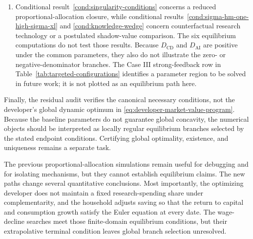 \begin{enumerate}[label=(\roman*)]
    and $qA/K$ are terminal boundary conditions. Only the convergence of the
    non-imposed ratios and the stability of the initial jumps and estimated boundary
    date constitute independent numerical evidence for the conditional singular
    branch.
    \item Conditional result~\ref{cond:singularity-conditions} concerns a reduced
    proportional-allocation closure, while
    conditional results~\ref{cond:sigma-hm-one-high-sigma-xl} and
    \ref{cond:knowledge-wedge} concern counterfactual research technology or a
    postulated shadow-value comparison. The six equilibrium computations do not
    test those results. Because $D_{\mathrm{CD}}$ and $D_{\mathrm{AI}}$ are positive
    under the common parameters, they also do not illustrate the zero- or
    negative-denominator branches. The Case III strong-feedback row in
    Table~\ref{tab:targeted-configurations} identifies a parameter region to be
    solved in future work; it is not plotted as an equilibrium path here.
\end{enumerate}

Finally, the residual audit verifies the canonical necessary conditions, not the
developer's global dynamic optimum in
\eqref{eq:developer-market-value-program}. Because the baseline parameters do not
guarantee global concavity, the numerical objects should be interpreted as locally
regular equilibrium branches selected by the stated endpoint conditions. Certifying
global optimality, existence, and uniqueness remains a separate task.

The previous proportional-allocation simulations remain useful for debugging and
for isolating mechanisms, but they cannot establish equilibrium claims. The new
paths change several quantitative conclusions. Most importantly, the optimizing
developer does not maintain a fixed research-spending share under complementarity,
and the household adjusts saving so that the return to capital and consumption
growth satisfy the Euler equation at every date. The wage-decline searches meet
those finite-domain equilibrium conditions, but their extrapolative terminal
condition leaves global branch selection unresolved.
